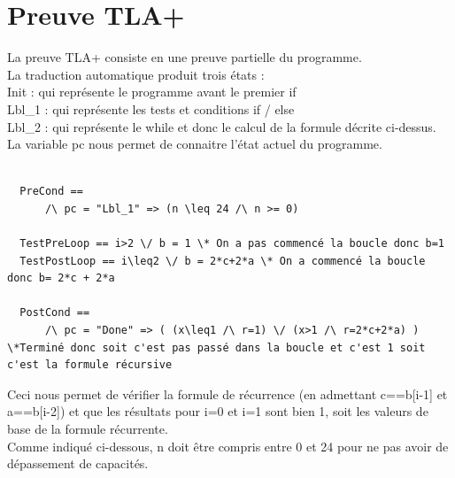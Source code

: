 \documentclass{scrreprt}
\begin{document}
\section{Preuve TLA+}
La preuve TLA+ consiste en une preuve partielle du programme.\\
La traduction automatique produit trois états :\\
Init : qui représente le programme avant le premier if\\
Lbl_1 : qui représente les tests et conditions if / else\\
Lbl_2 : qui représente le while et donc le calcul de la formule décrite ci-dessus.\\
La variable pc nous permet de connaitre l'état actuel du programme.\\
\\
\begin{lstlisting}
  PreCond ==
      /\ pc = "Lbl_1" => (n \leq 24 /\ n >= 0)

  TestPreLoop == i>2 \/ b = 1 \* On a pas commencé la boucle donc b=1
  TestPostLoop == i\leq2 \/ b = 2*c+2*a \* On a commencé la boucle donc b= 2*c + 2*a

  PostCond ==
      /\ pc = "Done" => ( (x\leq1 /\ r=1) \/ (x>1 /\ r=2*c+2*a) ) \*Terminé donc soit c'est pas passé dans la boucle et c'est 1 soit c'est la formule récursive
\end{lstlisting}

Ceci nous permet de vérifier la formule de récurrence (en admettant c==b[i-1] et a==b[i-2]) et que les résultats pour i=0 et i=1 sont bien 1, soit les valeurs de base de la formule récurrente.
\\
Comme indiqué ci-dessous, n doit être compris entre 0 et 24 pour ne pas avoir de dépassement de capacités.
\end{document}
